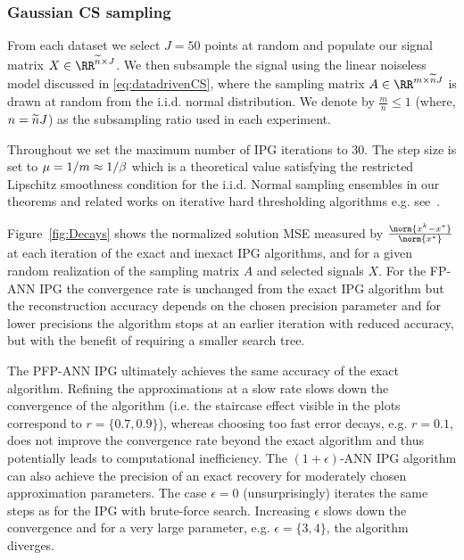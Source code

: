\subsubsection*{Gaussian CS sampling}
From each dataset we select $J=50$ points at random and populate our signal matrix $X\in \RR^{\n\times J}$. We then subsample the signal using the linear noiseless model discussed  in \eqref{eq:datadrivenCS}, where the sampling matrix $A\in \RR^{m\times \n J}$ is drawn at random from the i.i.d. 
normal distribution. We denote by $\frac{m}{n}\leq 1$ (where, $n=\widetilde n J$) as the subsampling ratio used in each experiment.
 
Throughout we set the maximum number of IPG iterations to $30$. The step size is set to $\mu = 1/m\approx 1/\beta$ which is a theoretical value satisfying the restricted Lipschitz smoothness condition for the i.i.d. Normal sampling ensembles in our theorems and related works on iterative hard thresholding algorithms e.g. see~\cite{IHTCS,AIHT,MIP}.

Figure~\ref{fig:Decays} shows the normalized solution MSE measured by $\frac{\norm{x^k-x^\gt}}{\norm{x^\gt}}$ at each iteration of the exact and inexact IPG algorithms, and
for a given random realization of the sampling matrix $A$ and selected signals $X$. 
For the FP-ANN IPG the convergence rate is unchanged from the exact IPG algorithm but the reconstruction accuracy depends on the chosen precision parameter and for lower precisions the algorithm
stops at an earlier iteration with reduced accuracy, but with the benefit of requiring a smaller search tree. 

The PFP-ANN IPG ultimately achieves the same accuracy of the exact algorithm. 
Refining the approximations at a slow rate slows down the convergence of the algorithm (i.e. the staircase effect visible in the plots correspond to  $r=\{0.7,0.9\}$), whereas choosing too fast error decays, e.g. $r=0.1$, does not improve the convergence rate beyond the exact algorithm and thus potentially leads to computational inefficiency. The $(1+\epsilon)$-ANN IPG algorithm can also achieve the precision of an exact recovery for moderately chosen approximation parameters. The case $\epsilon=0$ (unsurprisingly) iterates the same steps as for the IPG with brute-force search. Increasing $\epsilon$ slows down the convergence and for a very large parameter, e.g. $\epsilon=\{3,4\}$, the algorithm diverges.

